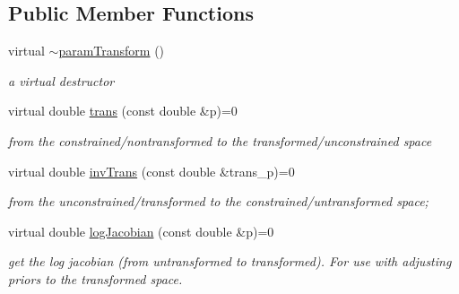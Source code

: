 \subsection*{Public Member Functions}
\begin{DoxyCompactItemize}
\item 
\mbox{\label{classparamTransform_a7eaa549e2a14fe05080378a5967d9c97}} 
virtual \hyperlink{classparamTransform_a7eaa549e2a14fe05080378a5967d9c97}{$\sim$param\+Transform} ()
\begin{DoxyCompactList}\small\item\em a virtual destructor \end{DoxyCompactList}\item 
\mbox{\label{classparamTransform_a0f380ca288488f76f15819704920bf27}} 
virtual double \hyperlink{classparamTransform_a0f380ca288488f76f15819704920bf27}{trans} (const double \&p)=0
\begin{DoxyCompactList}\small\item\em from the constrained/nontransformed to the transformed/unconstrained space \end{DoxyCompactList}\item 
\mbox{\label{classparamTransform_a183baf22182cddc645567ee202a895fc}} 
virtual double \hyperlink{classparamTransform_a183baf22182cddc645567ee202a895fc}{inv\+Trans} (const double \&trans\+\_\+p)=0
\begin{DoxyCompactList}\small\item\em from the unconstrained/transformed to the constrained/untransformed space; \end{DoxyCompactList}\item 
\mbox{\label{classparamTransform_a0b30b6b43073c589a1f48a61b2c0d77f}} 
virtual double \hyperlink{classparamTransform_a0b30b6b43073c589a1f48a61b2c0d77f}{log\+Jacobian} (const double \&p)=0
\begin{DoxyCompactList}\small\item\em get the log jacobian (from untransformed to transformed). For use with adjusting priors to the transformed space. \end{DoxyCompactList}\end{DoxyCompactItemize}
